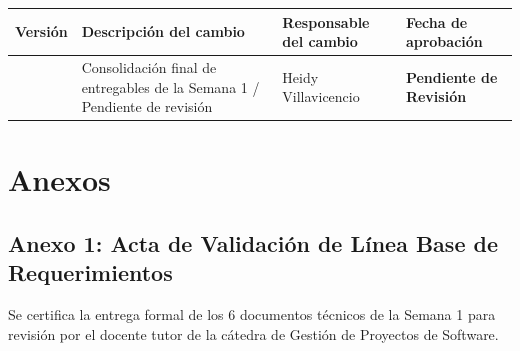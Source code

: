 \documentclass[12pt,a4paper]{article}
\begin{document}
\noindent
\renewcommand{\arraystretch}{1.2}
\begin{tabularx}{\textwidth}{|>{\hsize=0.45\hsize\centering\arraybackslash}X|>{\hsize=1.55\hsize\raggedright\arraybackslash}X|>{\hsize=1.2\hsize\raggedright\arraybackslash}X|>{\hsize=0.8\hsize\centering\arraybackslash}X|}
    \hline
    \rowcolor{gray!20}
    \textbf{Versión} & \textbf{Descripción del cambio} & \textbf{Responsable del cambio} & \textbf{Fecha de aprobación} \\
    \hline
    1.0 & Consolidación final de entregables de la Semana 1 / Pendiente de revisión & Heidy Villavicencio & \textbf{\textcolor{gray!90}{Pendiente de Revisión}} \\
    \hline
\end{tabularx}

\vspace{0.4cm}

\section{Anexos}
\subsection*{Anexo 1: Acta de Validación de Línea Base de Requerimientos}
Se certifica la entrega formal de los 6 documentos técnicos de la Semana 1 para revisión por el docente tutor de la cátedra de Gestión de Proyectos de Software.
\end{document}
